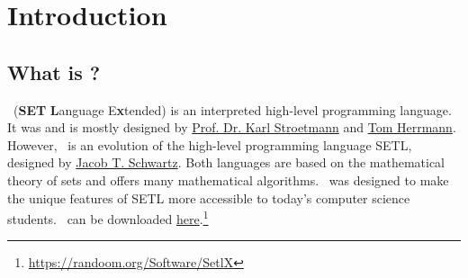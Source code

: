 
\chapter{Introduction}

\section*{What is \setlx?}

	\setlx\ (\textbf{SET} \textbf{L}anguage E\textbf{x}tended) is an interpreted high-level programming language. It was and is mostly designed by \href{https://github.com/karlstroetmann}{Prof. Dr. Karl Stroetmann} and \href{https://github.com/herrmanntom}{Tom Herrmann}. However, \setlx\ is an evolution of the high-level programming language SETL, designed by \href{https://en.wikipedia.org/wiki/Jacob_T._Schwartz}{Jacob T. Schwartz}. Both languages are based on the mathematical theory of sets and offers many mathematical algorithms. \setlx\ was designed to make the unique features of SETL more accessible to today's computer science students. \setlx\ can be downloaded \href{https://randoom.org/Software/SetlX}{here}.\footnote{\url{https://randoom.org/Software/SetlX}}